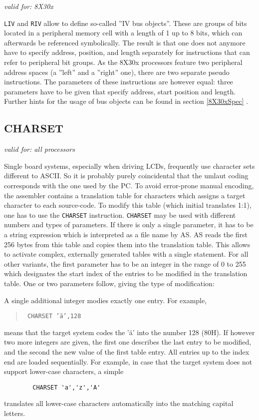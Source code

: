 \documentclass[12pt,twoside]{report}
\makeatletter
\newcommand{\tty}[1]{{\tt #1}}
\newcommand{\ttindex}[1]{\index{#1@{\tt #1}}}
\makeatother
\begin{document}
{\em valid for: 8X30x} 
                   
\tty{LIV} and \tty{RIV} allow to define so-called ''IV bus objects''. 
These are   
groups of bits located in a peripheral memory cell with a length of 1 
up to 8 bits, which can afterwards be referenced symbolically.  The  
result is that one does not anymore have to specify address,
position, and length separately for instructions that can refer to   
peripheral bit groups.  As the 8X30x processors feature two
peripheral address spaces (a ''left'' and a ''right'' one), there are two 
separate pseudo instructions.  The parameters of these instructions  
are however equal: three parameters have to be given that specify
address, start position and length.  Further hints for the usage of  
bus objects can be found in section \ref{8X30xSpec} .


\subsection{CHARSET}
\ttindex{CHARSET}

{\em valid for: all processors}

Single board systems, especially when driving LCDs, frequently use
character sets different to ASCII.  So it is probably purely coincidental
that the umlaut coding corresponds with the one used by the PC.  To avoid
error-prone manual encoding, the assembler contains a translation table
for characters which assigns a target character to each source-code.  To
modify this table (which initial translates 1:1), one has to use the
\tty{CHARSET} instruction.  \tty{CHARSET} may be used with different
numbers and types of parameters.  If there is only a single parameter, it
has to be a string expression which is interpreted as a file name by AS. 
AS reads the first 256 bytes from this table and copies them into the
translation table.  This allows to activate complex, externally generated
tables with a single statement.  For all other variants, the first
parameter has to be an integer in the range of 0 to 255 which designates
the start index of the entries to be modified in the translation table. 
One or two parameters follow, giving the type of modification:

A single additional integer modies exactly one entry.  For example,
\begin{quote}{\tt
       CHARSET  '\"a',128
}\end{quote}
means that the target system codes the '\"a'  into the number 128
(80H).  If however two more integers are given, the first one describes
the last entry to be modified, and the second the new value of the first
table entry.  All entries up to the index end are loaded sequentially.
For example, in case that the target system does not support lower-case
characters, a simple
\begin{verbatim}
        CHARSET 'a','z','A'
\end{verbatim}
translates all lower-case characters  automatically into the 
matching capital letters.
\end{document}

